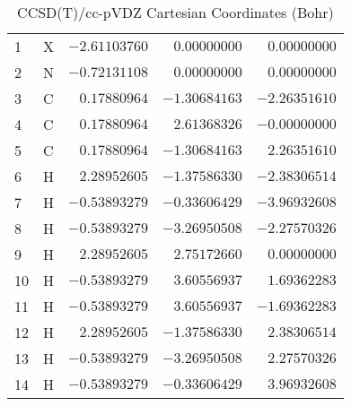\documentclass[10pt,oneside]{article}
\begin{document}
\begin{table}[h!]
\centering
\caption{CCSD(T)/cc-pVDZ Cartesian Coordinates (Bohr)}
\begin{tabular}{llrrr}
1  & X  & $-2.61103760$ & $ 0.00000000$ & $ 0.00000000$ \\
2  & N  & $-0.72131108$ & $ 0.00000000$ & $ 0.00000000$ \\
3  & C  & $ 0.17880964$ & $-1.30684163$ & $-2.26351610$ \\
4  & C  & $ 0.17880964$ & $ 2.61368326$ & $-0.00000000$ \\
5  & C  & $ 0.17880964$ & $-1.30684163$ & $ 2.26351610$ \\
6  & H  & $ 2.28952605$ & $-1.37586330$ & $-2.38306514$ \\
7  & H  & $-0.53893279$ & $-0.33606429$ & $-3.96932608$ \\
8  & H  & $-0.53893279$ & $-3.26950508$ & $-2.27570326$ \\
9  & H  & $ 2.28952605$ & $ 2.75172660$ & $ 0.00000000$ \\
10 & H  & $-0.53893279$ & $ 3.60556937$ & $ 1.69362283$ \\
11 & H  & $-0.53893279$ & $ 3.60556937$ & $-1.69362283$ \\
12 & H  & $ 2.28952605$ & $-1.37586330$ & $ 2.38306514$ \\
13 & H  & $-0.53893279$ & $-3.26950508$ & $ 2.27570326$ \\
14 & H  & $-0.53893279$ & $-0.33606429$ & $ 3.96932608$ \\
\end{tabular}
\end{table}
\end{document}
